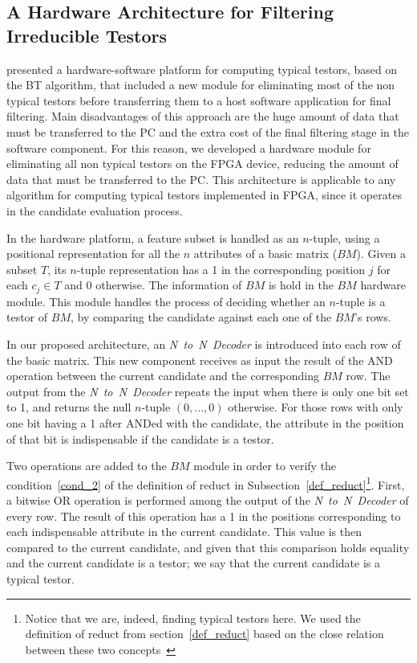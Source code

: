 \documentclass[authoryear,11pt]{elsarticle}
\begin{document}
	
\subsection{A Hardware Architecture for Filtering Irreducible Testors}\label{OnlyTT}
	\cite{Rojas12} presented a hardware-software platform for computing typical testors, based on the BT algorithm, 
	that included a new module for eliminating most of the non typical testors before transferring them to a host 
	software application for final filtering. Main disadvantages of this approach are the huge amount of data that 
	must be transferred to the PC and the extra cost of the final filtering stage in the software component.  
	For this reason, we developed a hardware module for eliminating all non typical testors 
	on the FPGA device, reducing the amount of data that must be transferred to the PC. This architecture is 
	applicable to any algorithm for computing typical testors implemented in FPGA, since it operates in the 
	candidate evaluation process.
	
	In the hardware platform, a feature subset is handled as an $n$-tuple, using a positional 
	representation for all the $n$ attributes of a basic matrix ($BM$). Given a subset $T$, its $n$-tuple 
	representation has a 1 in the corresponding position $j$ for each $c_j \in T$ and 0 otherwise.
	The information of $BM$ is hold in the $BM$ hardware module. This module handles the process of 
	deciding whether an $n$-tuple is a testor of $BM$, by comparing the candidate against each one of the 
	$BM$'s rows.

	In our proposed architecture, an \textit{N~to~N~Decoder} is introduced into each 
	row of the basic matrix. This new component receives as input 
	the result of the AND operation between the current candidate and the corresponding $BM$ row.
	The output from the \textit{N~to~N~Decoder} repeats the input when there is only one bit set
	to 1, and returns the null $n$-tuple $(0,...,0)$ otherwise. For those rows with only one bit having a 
	1 after ANDed with the candidate, the attribute in the position of that bit is indispensable if the 
	candidate is a testor.
	
	Two operations are added to the $BM$ module in order to verify the condition~\ref{cond_2} of the definition
	of reduct in Subsection~\ref{def_reduct}\footnote{Notice that we are, indeed, finding typical testors here. We
	used the definition of reduct from section~\ref{def_reduct} based on the close relation between these two
	concepts~\citep{Lazo15}}.
	First, a bitwise OR operation is performed among the output of the \textit{N~to~N~Decoder} of every row. 
	The result of this operation has a 1 in the positions corresponding to each indispensable attribute in the
	current 	candidate. This value is then compared to the current candidate, and 	given that this comparison 
	holds equality and the current candidate is a testor; we say that the current candidate is a typical testor.
	
\end{document}

